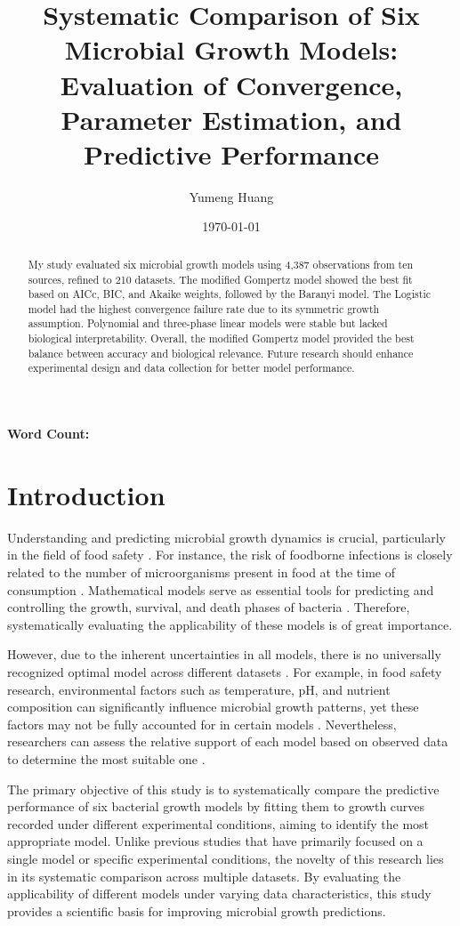 \documentclass[12pt]{article}
\title{Systematic Comparison of Six Microbial Growth Models: Evaluation of Convergence, Parameter Estimation, and Predictive Performance}
\author{Yumeng Huang}
\date{\today}
\newcommand\wordcount{%
  \immediate\write18{texcount -sum -1 main.tex > wordcount.txt} %
}
\begin{document}
\maketitle

% 
\noindent \textbf{Word Count:} \wordcount

\begin{abstract}
My study evaluated six microbial growth models using 4,387 observations from ten sources, refined to 210 datasets. The modified Gompertz model showed the best fit based on AICc, BIC, and Akaike weights, followed by the Baranyi model. The Logistic model had the highest convergence failure rate due to its symmetric growth assumption. Polynomial and three-phase linear models were stable but lacked biological interpretability. Overall, the modified Gompertz model provided the best balance between accuracy and biological relevance. Future research should enhance experimental design and data collection for better model performance.
\end{abstract}


\section{Introduction}

Understanding and predicting microbial growth dynamics is crucial, particularly in the field of food safety \citep{BaranyiRoberts1994}. For instance, the risk of foodborne infections is closely related to the number of microorganisms present in food at the time of consumption \citep{RossMcMeekin2003}. Mathematical models serve as essential tools for predicting and controlling the growth, survival, and death phases of bacteria \citep{LoGrasso2023}. Therefore, systematically evaluating the applicability of these models is of great importance.

However, due to the inherent uncertainties in all models, there is no universally recognized optimal model across different datasets \citep{Marks2008}. For example, in food safety research, environmental factors such as temperature, pH, and nutrient composition can significantly influence microbial growth patterns, yet these factors may not be fully accounted for in certain models \citep{RossMcMeekin2003}. Nevertheless, researchers can assess the relative support of each model based on observed data to determine the most suitable one \citep{JohnsonOmland2004}.

The primary objective of this study is to systematically compare the predictive performance of six bacterial growth models by fitting them to growth curves recorded under different experimental conditions, aiming to identify the most appropriate model. Unlike previous studies that have primarily focused on a single model or specific experimental conditions, the novelty of this research lies in its systematic comparison across multiple datasets. By evaluating the applicability of different models under varying data characteristics, this study provides a scientific basis for improving microbial growth predictions.
\end{document}
